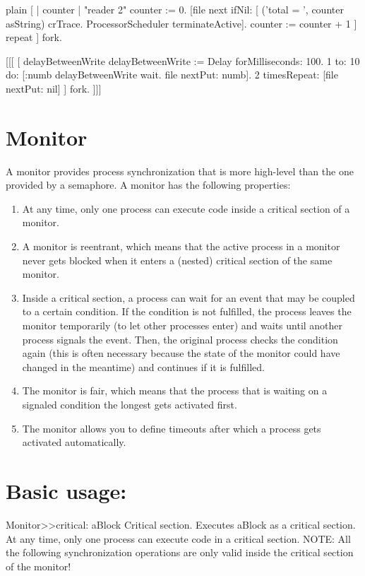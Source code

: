 \documentclass[10pt,twoside,english]{_support/latex/sbabook/sbabook}
\begin{document}
\begin{displaycode}{plain}
	[ | counter | "reader 2" 
	counter := 0. 
	[file next ifNil: [ ('total = ', counter asString) crTrace.
		ProcessorScheduler terminateActive].
		counter := counter + 1 ] repeat 
	] fork.
\end{displaycode}

 {[}{[}{[}
{[}	
	\textbar{} delayBetweenWrite \textbar{}
	delayBetweenWrite := Delay forMilliseconds: 100.   
	1 to: 10 do: {[}:numb\textbar{} 
		delayBetweenWrite wait.
		file nextPut: numb{]}.
	2 timesRepeat: {[}file nextPut: nil{]}
	{]} fork. 
{]}{]}{]}
\section{Monitor}
A monitor provides process synchronization that is more high-level than the one provided by a semaphore. A monitor has the following properties:

\begin{enumerate}
\item At any time, only one process can execute code inside a critical section of a monitor.
\item A monitor is reentrant, which means that the active process in a monitor never gets blocked when it enters a (nested) critical section of the same monitor.
\item Inside a critical section, a process can wait for an event that may be coupled to a certain condition. If the condition is not fulfilled, the process leaves the monitor temporarily (to let other processes enter) and waits until another process signals the event. Then, the original process checks the condition again (this is often necessary because the state of the monitor could have changed in the meantime) and continues if it is fulfilled.
\item The monitor is fair, which means that the process that is waiting on a signaled condition the longest gets activated first.
\item The monitor allows you to define timeouts after which a process gets activated automatically.
\end{enumerate}
\section{Basic usage:}
Monitor\textgreater{}\textgreater{}critical: aBlock
Critical section.
Executes aBlock as a critical section. At any time, only one process can execute code in a critical section.
NOTE: All the following synchronization operations are only valid inside the critical section of the monitor!
\end{document}
